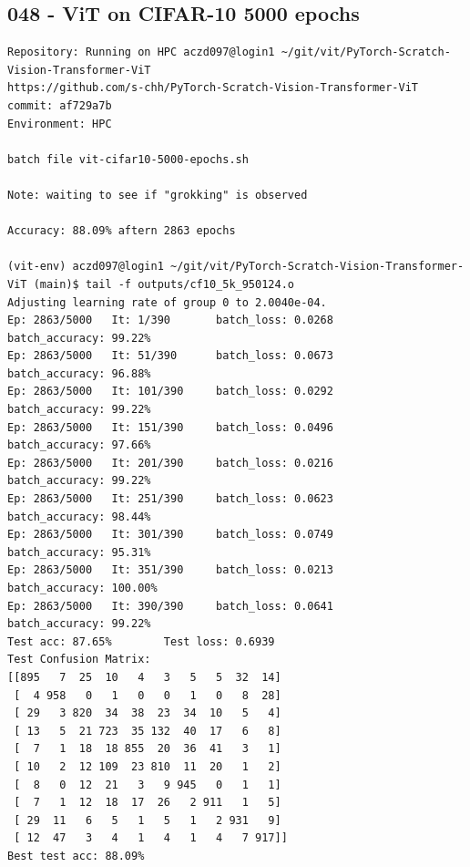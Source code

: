 \subsection{048 - ViT on CIFAR-10 5000 epochs}
\label{app_res:048}
\begin{verbatim}
Repository: Running on HPC aczd097@login1 ~/git/vit/PyTorch-Scratch-Vision-Transformer-ViT
https://github.com/s-chh/PyTorch-Scratch-Vision-Transformer-ViT
commit: af729a7b
Environment: HPC

batch file vit-cifar10-5000-epochs.sh

Note: waiting to see if "grokking" is observed

Accuracy: 88.09% aftern 2863 epochs

(vit-env) aczd097@login1 ~/git/vit/PyTorch-Scratch-Vision-Transformer-ViT (main)$ tail -f outputs/cf10_5k_950124.o
Adjusting learning rate of group 0 to 2.0040e-04.
Ep: 2863/5000   It: 1/390       batch_loss: 0.0268      batch_accuracy: 99.22%
Ep: 2863/5000   It: 51/390      batch_loss: 0.0673      batch_accuracy: 96.88%
Ep: 2863/5000   It: 101/390     batch_loss: 0.0292      batch_accuracy: 99.22%
Ep: 2863/5000   It: 151/390     batch_loss: 0.0496      batch_accuracy: 97.66%
Ep: 2863/5000   It: 201/390     batch_loss: 0.0216      batch_accuracy: 99.22%
Ep: 2863/5000   It: 251/390     batch_loss: 0.0623      batch_accuracy: 98.44%
Ep: 2863/5000   It: 301/390     batch_loss: 0.0749      batch_accuracy: 95.31%
Ep: 2863/5000   It: 351/390     batch_loss: 0.0213      batch_accuracy: 100.00%
Ep: 2863/5000   It: 390/390     batch_loss: 0.0641      batch_accuracy: 99.22%
Test acc: 87.65%        Test loss: 0.6939
Test Confusion Matrix:
[[895   7  25  10   4   3   5   5  32  14]
 [  4 958   0   1   0   0   1   0   8  28]
 [ 29   3 820  34  38  23  34  10   5   4]
 [ 13   5  21 723  35 132  40  17   6   8]
 [  7   1  18  18 855  20  36  41   3   1]
 [ 10   2  12 109  23 810  11  20   1   2]
 [  8   0  12  21   3   9 945   0   1   1]
 [  7   1  12  18  17  26   2 911   1   5]
 [ 29  11   6   5   1   5   1   2 931   9]
 [ 12  47   3   4   1   4   1   4   7 917]]
Best test acc: 88.09%

\end{verbatim}

